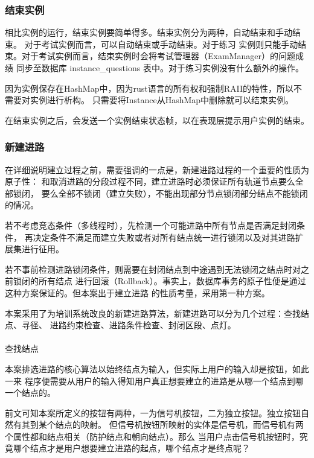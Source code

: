 \subsubsection{结束实例}
相比实例的运行，结束实例要简单得多。结束实例分为两种，自动结束和手动结束。
对于考试实例而言，可以自动结束或手动结束。对于练习
实例则只能手动结束。对于考试实例而言，结束实例时会将考试管理器（ExamManager）的问题成绩
同步至数据库 instance\_questions 表中。对于练习实例没有什么额外的操作。

因为实例保存在HashMap中，因为rust语言的所有权和强制RAII的特性，所以不需要对实例进行析构。
只需要将Instance从HashMap中删除就可以结束实例。

在结束实例之后，会发送一个实例结束状态帧，以在表现层提示用户实例的结束。

\subsubsection{新建进路}
在详细说明建立过程之前，需要强调的一点是，新建进路过程的一个重要的性质为原子性：
和取消进路的分段过程不同，建立进路时必须保证所有轨道节点要么全部锁闭，
要么全部不锁闭（建立失败），不能出现部分节点锁闭部分结点不能锁闭的情况。

若不考虑竞态条件（多线程时），先检测一个可能进路中所有节点是否满足封闭条件，
再决定条件不满足而建立失败或者对所有结点统一进行锁闭以及对其进路扩展集进行征用。

若不事前检测进路锁闭条件，则需要在封闭结点到中途遇到无法锁闭之结点时对之前锁闭的所有结点
进行回滚（Rollback）。事实上，数据库事务的原子性便是通过这种方案保证的。但本案出于建立进路
的性质考量，采用第一种方案。

本案采用了为培训系统改良的新建进路算法，新建进路可以分为几个过程：查找结点、寻径、
进路约束检查、进路条件检查、封闭区段、点灯。

\paragraph{}查找结点

本案排选进路的核心算法以始终结点为输入，但实际上用户的输入却是按钮，如此一来
程序便需要从用户的输入得知用户真正想要建立的进路是从哪一个结点到哪一个结点的。

前文可知本案所定义的按钮有两种，一为信号机按钮，二为独立按钮。独立按钮自然有其到某个结点的映射。
但信号机按钮所映射的实体是信号机，而信号机有两个属性都和结点相关（防护结点和朝向结点）。那么
当用户点击信号机按钮时，究竟哪个结点才是用户想要建立进路的起点，哪个结点才是终点呢？

